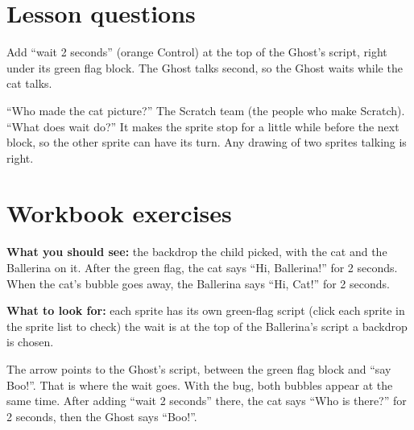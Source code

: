 
\section{Lesson questions}
\begin{answer}
Add \enquote{wait 2 seconds} (orange Control) at the top of the Ghost's script, right under its green flag block. The Ghost talks second, so the Ghost waits while the cat talks.
\end{answer}

\begin{answer}[Reflection]
\enquote{Who made the cat picture?} The Scratch team (the people who make Scratch). \enquote{What does wait do?} It makes the sprite stop for a little while before the next block, so the other sprite can have its turn. Any drawing of two sprites talking is right.
\end{answer}

\section{Workbook exercises}
\begin{answer}
\textbf{What you should see:} the backdrop the child picked, with the cat and the Ballerina on it. After the green flag, the cat says \enquote{Hi, Ballerina!} for 2 seconds. When the cat's bubble goes away, the Ballerina says \enquote{Hi, Cat!} for 2 seconds.

\textbf{What to look for:} \tickbox{} each sprite has its own green-flag script (click each sprite in the sprite list to check) \quad \tickbox{} the wait is at the top of the Ballerina's script \quad \tickbox{} a backdrop is chosen.
\end{answer}

\begin{answer}
The arrow points to the Ghost's script, between the green flag block and \enquote{say Boo!}. That is where the wait goes. With the bug, both bubbles appear at the same time. After adding \enquote{wait 2 seconds} there, the cat says \enquote{Who is there?} for 2 seconds, then the Ghost says \enquote{Boo!}.
\end{answer}

